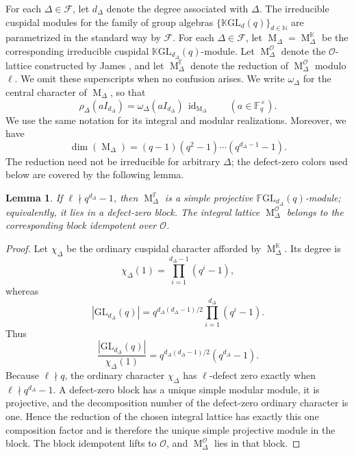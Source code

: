\documentclass[12pt]{amsart}
\numberwithin{itemcounter}{subsection}
\theoremstyle{plain}
\newtheorem{lemma}[theorem]{Lemma}
\theoremstyle{definition}
\theoremstyle{remark}
\numberwithin{equation}{section}
\def\bbF{\mathbb{F}}
\def\bbK{\mathbb{K}}
\def\calF{\mathcal{F}}
\def\calO{\mathcal{O}}
\def\GL{\mathrm{GL}}
\def\M{{\operatorname{M}\nolimits}}
\def\id{\operatorname{id}\nolimits}
\begin{document}
For each \(\Delta \in \calF\), let \(d_\Delta\) denote the degree associated with \(\Delta\). The irreducible cuspidal modules for the family of group algebras \(\{\bbK \mathrm{GL}_d(q)\}_{d \in \mathbb{N}}\) are parametrized in the standard way by \(\calF\).
For each \(\Delta \in \calF\), let \(\M_\Delta=\M_\Delta^\bbK\) be the corresponding irreducible cuspidal \(\bbK \mathrm{GL}_{d_\Delta}(q)\)-module.
Let \(\M^\calO_\Delta\) denote the \(\calO\)-lattice constructed by James \cite{Jam86}, and let \(\M^\bbF_\Delta\) denote the reduction of \(\M^\calO_\Delta\) modulo \(\ell\). We omit these superscripts when no confusion arises.
We write \(\omega_\Delta\) for the central character of \(\M_\Delta\), so that
\[
 \rho_\Delta(aI_{d_\Delta})=\omega_\Delta(aI_{d_\Delta})\,\id_{\M_\Delta}
 \qquad(a\in\bbF_q^\times).
\]
We use the same notation for its integral and modular realizations.
Moreover, we have
\[
\dim(\M_\Delta)= (q-1)(q^2-1)\cdots (q^{d_\Delta-1}-1).
\]
The reduction need not be irreducible for arbitrary $\Delta$; the defect-zero colors used below are covered by the following lemma.
\begin{lemma}\label{Lem:ellnmidq}
  If $\ell\nmid q^{d_\Delta}-1$, then $\M^\bbF_\Delta$ is a simple projective $\bbF\GL_{d_\Delta}(q)$-module; equivalently, it lies in a defect-zero block.  The integral lattice $\M^\calO_\Delta$ belongs to the corresponding block idempotent over $\calO$.
  \end{lemma}
  \begin{proof}
Let $\chi_\Delta$ be the ordinary cuspidal character afforded by
$\M_\Delta^\bbK$.  Its degree is
\[
 \chi_\Delta(1)=\prod_{i=1}^{d_\Delta-1}(q^i-1),
\]
whereas
\[
 |\GL_{d_\Delta}(q)|
 =q^{d_\Delta(d_\Delta-1)/2}
   \prod_{i=1}^{d_\Delta}(q^i-1).
\]
Thus
\[
 \frac{|\GL_{d_\Delta}(q)|}{\chi_\Delta(1)}
 =q^{d_\Delta(d_\Delta-1)/2}(q^{d_\Delta}-1).
\]
Because $\ell\nmid q$, the ordinary character $\chi_\Delta$ has
$\ell$-defect zero exactly when $\ell\nmid q^{d_\Delta}-1$.  A defect-zero block has a unique simple modular module, it is projective, and the decomposition number of the defect-zero ordinary character is one.  Hence the reduction of the chosen integral lattice has exactly this one composition factor and is therefore the unique simple projective module in the block.  The block idempotent lifts to $\calO$, and $\M_\Delta^\calO$ lies in that block.
  \end{proof}
\end{document}
